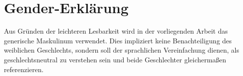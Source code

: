 
\thispagestyle{empty}

\section*{Gender-Erklärung}
\vspace*{2em}

Aus Gründen der leichteren Lesbarkeit wird in der vorliegenden Arbeit das generische Maskulinum verwendet. Dies impliziert keine Benachteiligung des weiblichen Geschlechts, sondern soll der sprachlichen Vereinfachung dienen, als geschlechtsneutral zu verstehen sein und beide Geschlechter gleichermaßen referenzieren.



